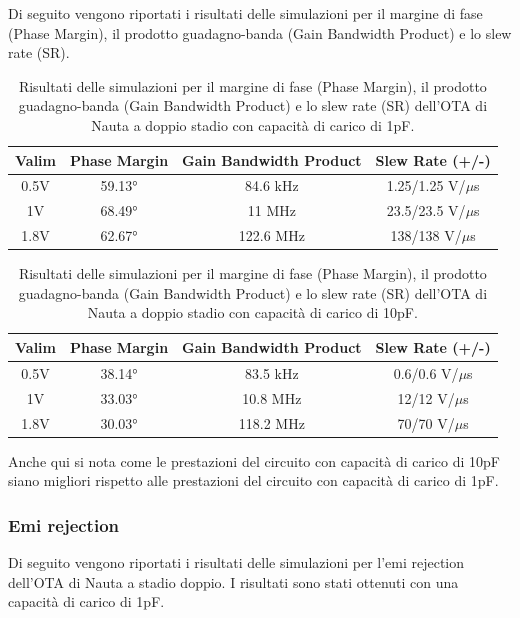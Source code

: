 Di seguito vengono riportati i risultati delle simulazioni per il margine di fase (Phase Margin), il prodotto guadagno-banda (Gain Bandwidth Product) e lo slew rate (SR).

\begin{table}[H]
    \centering
    \caption{Risultati delle simulazioni per il margine di fase (Phase Margin), il prodotto guadagno-banda (Gain Bandwidth Product) e lo slew rate (SR) dell'OTA di Nauta a doppio stadio con capacità di carico di 1pF.}
    \begin{tabular}{|c|c|c|c|}
        \hline
        \textbf{Valim} & \textbf{Phase Margin} & \textbf{Gain Bandwidth Product} & \textbf{Slew Rate (+/-)} \\ \hline
        0.5V & 59.13° & 84.6 kHz & 1.25/1.25 V/$\mu$s \\ \hline
        1V & 68.49° & 11 MHz & 23.5/23.5 V/$\mu$s \\ \hline
        1.8V & 62.67° & 122.6 MHz & 138/138 V/$\mu$s \\ \hline
    \end{tabular}
    \label{tab:results_nauta_double_stage_1pF}
\end{table}

\begin{table}[H]
    \centering
    \caption{Risultati delle simulazioni per il margine di fase (Phase Margin), il prodotto guadagno-banda (Gain Bandwidth Product) e lo slew rate (SR) dell'OTA di Nauta a doppio stadio con capacità di carico di 10pF.}
    \begin{tabular}{|c|c|c|c|}
        \hline
        \textbf{Valim} & \textbf{Phase Margin} & \textbf{Gain Bandwidth Product} & \textbf{Slew Rate (+/-)} \\ \hline
        0.5V & 38.14° & 83.5 kHz & 0.6/0.6 V/$\mu$s \\ \hline
        1V & 33.03° & 10.8 MHz & 12/12 V/$\mu$s \\ \hline
        1.8V & 30.03° & 118.2 MHz & 70/70 V/$\mu$s \\ \hline
    \end{tabular}
    \label{tab:results_nauta_double_stage_10pF}
\end{table}

Anche qui si nota come le prestazioni del circuito con capacità di carico di 10pF siano migliori rispetto alle prestazioni del circuito con capacità di carico di 1pF.

\subsubsection{Emi rejection}
\label{sec:results_ota_nauta_double_stage_emi_rejection}
Di seguito vengono riportati i risultati delle simulazioni per l'emi rejection dell'OTA di Nauta a stadio doppio. I risultati sono stati ottenuti con una capacità di carico di 1pF.

